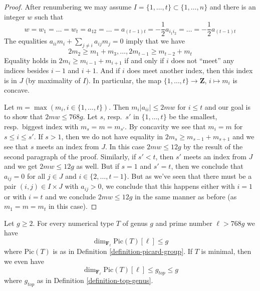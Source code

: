 \begin{proof}
\medskip\noindent
After renumbering we may assume $I = \{1, \ldots, t\} \subset \{1, \ldots, n\}$
and there is an integer $w$ such that
$$
w = w_1 = \ldots = w_t =
a_{12} = \ldots = a_{(t - 1) t} =
-\frac{1}{2} a_{i_1i_2} = \ldots = -\frac{1}{2} a_{(t - 1) t}
$$
The equalities $a_{ii}m_i + \sum_{j \not = i} a_{ij}m_j = 0$ imply
that we have
$$
2m_2 \geq m_1 + m_3, \ldots, 2m_{t - 1} \geq m_{t - 2} + m_t
$$
Equality holds in $2m_i \geq m_{i - 1} + m_{i + 1}$
if and only if $i$ does not ``meet'' any indices besides
$i - 1$ and $i + 1$. And if $i$ does meet
another index, then this index is in $J$ (by maximality of $I$).
In particular, the map
$\{1, \ldots, t\} \to \mathbf{Z}$, $i \mapsto m_i$ is concave.

\medskip\noindent
Let $m = \max(m_i, i \in \{1, \ldots, t\})$. Then
$m_i|a_{ii}| \leq 2mw$ for $i \leq t$ and
our goal is to show that $2mw \leq 768g$.
Let $s$, resp.\ $s'$ in $\{1, \ldots, t\}$ be the
smallest, resp.\ biggest index with $m_s = m = m_{s'}$.
By concavity we see that $m_i = m$ for $s \leq i \leq s'$.
If $s > 1$, then we do not have equality in
$2m_s \geq m_{s - 1} + m_{s + 1}$
and we see that $s$ meets an index from $J$.
In this case $2mw \leq 12g$ by the result of the second paragraph
of the proof.
Similarly, if $s' < t$, then $s'$ meets an index from $J$
and we get $2mw \leq 12g$ as well.
But if $s = 1$ and $s' = t$, then we conclude
that $a_{ij} = 0$ for all $j \in J$ and $i \in \{2, \ldots, t - 1\}$.
But as we've seen that there must be a pair $(i, j) \in I \times J$
with $a_{ij} > 0$, we conclude that this happens either with
$i = 1$ or with $i = t$ and we conclude $2mw \leq 12g$
in the same manner as before (as $m_1 = m = m_t$ in this case).
\end{proof}

\begin{proposition}
\label{proposition-bound-picard-group}
Let $g \geq 2$. For every numerical type $T$ of genus $g$
and prime number $\ell > 768g$ we have
$$
\dim_{\mathbf{F}_\ell} \text{Pic}(T)[\ell] \leq g
$$
where $\text{Pic}(T)$ is as in Definition \ref{definition-picard-group}.
If $T$ is minimal, then we even have
$$
\dim_{\mathbf{F}_\ell} \text{Pic}(T)[\ell] \leq g_{top} \leq g
$$
where $g_{top}$ as in Definition \ref{definition-top-genus}.
\end{proposition}

